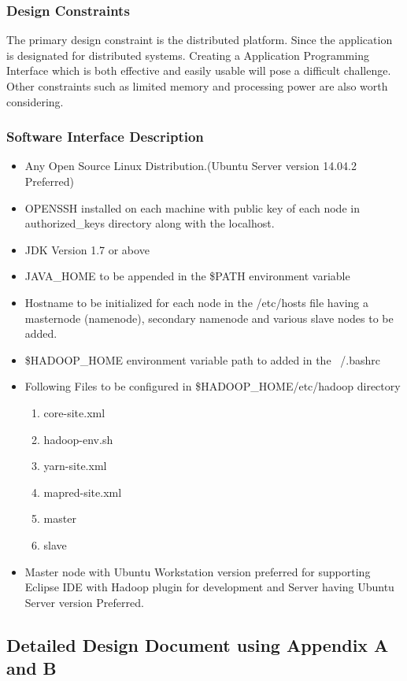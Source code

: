 \documentclass[oneside,a4paper,12pt]{report}
\begin{document}
\subsection{Design Constraints}
The primary design constraint is the distributed platform. Since the application is designated for distributed systems. Creating a Application Programming  Interface which is both effective and easily usable will pose a difficult challenge. Other constraints such as limited memory and processing power are also worth considering.

\subsection{Software Interface Description}
\begin{itemize}
\item Any Open Source Linux Distribution.(Ubuntu Server version 14.04.2 Preferred)
\item OPENSSH installed on each machine with public key of each node in authorized\_keys directory along with the localhost.
\item JDK Version 1.7 or above
\item JAVA\_HOME to be appended in the \$PATH environment variable
\item Hostname to be initialized for each node in the /etc/hosts file having a masternode (namenode), secondary namenode and various slave nodes to be added.
\item \$HADOOP\_HOME environment variable path to added in the ~/.bashrc 
\item Following Files to be configured in \$HADOOP\_HOME/etc/hadoop directory

	\begin{enumerate}
	\item core-site.xml
	\item hadoop-env.sh
	\item yarn-site.xml
	\item mapred-site.xml
	\item master
	\item slave
	\end{enumerate}

\item Master node with Ubuntu Workstation version preferred for supporting Eclipse IDE with Hadoop plugin for development and Server having Ubuntu Server version Preferred.
\end{itemize}


\begin{center}
\chapter{Detailed Design Document using Appendix A and B}
\newpage
\end{center}
\end{document}
